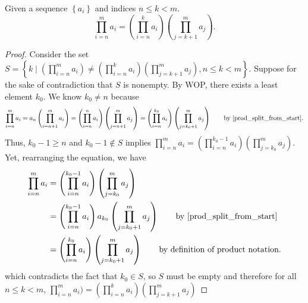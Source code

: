 \begin{lemma}\label{prod_split_from_middle}
    Given a sequence $\left\{ a_i \right\}$ and indices $n\leq k< m$.
    \begin{equation*}
        \prod_{i=n}^m a_i=\left(\prod_{i=n}^{k} a_i\right) \left(\prod_{j=k+1}^m a_j\right).
    \end{equation*}
\end{lemma}
\begin{proof}
    Consider the set $S=\left\{ k\mid (\prod_{i=n}^m a_i) \neq \left(\prod_{i=n}^{k} a_i\right) \left(\prod_{j=k+1}^m a_j\right), n\leq k<m \right\}$. Suppose for the sake of contradiction that $S$ is nonempty. By WOP, there exists a least element $k_0$. We know $k_0\neq n$ because
    \begin{equation*}
            \prod_{i=n}^m a_i=a_n \left( \prod_{i=n+1}^m a_i \right) 
            = \left( \prod_{i=n}^n a_i \right) \left( \prod_{j=n+1}^m a_j \right)=\left( \prod_{i=n}^{k_0} a_i\right) \left(\prod_{j=k_0+1}^m a_j\right) \qquad \text{by \ref{prod_split_from_start}}.
    \end{equation*}
    Thus, $k_0-1\geq n$ and $k_0-1\notin S$ implies $\prod_{i=n}^m a_i = \left(\prod_{i=n}^{k_0-1} a_i\right)\left(\prod_{j=k_0}^m a_j\right)$. Yet, rearranging the equation, we have
    \begin{equation*}
        \begin{aligned}
            \prod_{i=n}^m a_i&=\left(\prod_{i=n}^{k_0-1} a_i\right)\left(\prod_{j=k_0}^m a_j\right)\\
            &=\left(\prod_{i=n}^{k_0-1} a_i\right)a_{k_0}\left(\prod_{j=k_0+1}^m a_j\right) \qquad \text{by \ref{prod_split_from_start}}\\
            &=\left(\prod_{i=n}^{k_0} a_i\right)\left(\prod_{j=k_0+1}^m a_j\right) \qquad \text{by definition of product notation.}
        \end{aligned}
    \end{equation*}
    which contradicts the fact that $k_0\in S$, so $S$ must be empty and therefore for all $n\leq k<m$, $\prod_{i=n}^m a_i) = \left(\prod_{i=n}^{k} a_i\right) \left(\prod_{j=k+1}^m a_j\right)$
\end{proof}

